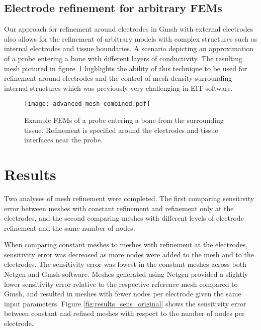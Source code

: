 \documentclass[12pt]{iopart}
\begin{document}

\subsection{Electrode refinement for arbitrary FEMs}
Our approach for refinement around electrodes in Gmsh with external electrodes 
also allows for the refinement of arbitrary models with complex structures
such as internal electrodes and tissue boundaries.
A scenario depicting an approximation of 
a probe entering a bone with different 
layers of conductivity. The resulting mesh pictured in 
figure~\ref{fig:adv_mesh}
highlights the ability of this technique
to be used for refinement around electrodes and the control of mesh density  
surrounding internal structures which was previously
very challenging in EIT software.
 
\begin{figure}
  \texttt{[image: advanced\_mesh\_combined.pdf]}
    \caption{\label{fig:adv_mesh} Example FEMs of a probe entering a bone from the surrounding 
    tissue. Refinement is specified around the electrodes and tissue interfaces near the probe.}
\end{figure}
 

\section{Results}

Two analyses of mesh refinement were completed. The first comparing sensitivity error between
meshes with constant refinement and refinement only at the electrodes, and the second 
comparing meshes with different levels of electrode refinement and the same number of nodes.

When comparing constant meshes to meshes with refinement at the electrodes, sensitivity error
was decreased as more nodes were added to the mesh and to the electrodes. The sensitivity
error was lowest in the constant meshes across both Netgen and Gmsh software. Meshes 
generated using Netgen
provided a slightly lower sensitivity error relative to the respective reference mesh
compared to Gmsh, and resulted in meshes with fewer nodes per electrode given the same input
parameters. Figure \ref{fig:results_sens_original} shows the sensitivity error between
constant and refined meshes with respect to the number of nodes per electrode.  
\end{document}
